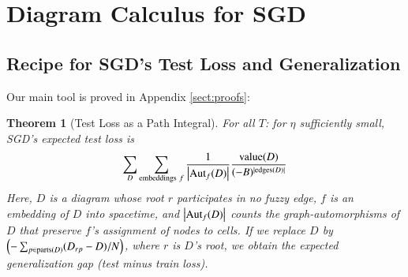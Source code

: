 \documentclass{article}
\theoremstyle{plain}
\newtheorem{thm}{Theorem}
\theoremstyle{definition}
\newcommand{\wrap}[1]{\left(#1\right)}
\newcommand{\wabs}[1]{\left|#1\right|}
\newcommand{\Aut}{\text{\textnormal{Aut}}}
\newcommand{\dvalue}{\text{\textnormal{value}}}
\newcommand{\edges}{\text{\textnormal{edges}}}
\newcommand{\parts}{\text{\textnormal{parts}}}
\begin{document}

\section{Diagram Calculus for SGD} \label{sect:calculus}

           
    \subsection{Recipe for SGD's Test Loss and Generalization}

        Our main tool is proved in Appendix \ref{sect:proofs}:
        
        \begin{thm}[Test Loss as a Path Integral] \label{thm:sgdcoef}
            For all $T$: for $\eta$ sufficiently small, SGD's expected test
            loss is
            \begin{equation*}\label{eq:sgdcoef}
                \sum_{D}
                    \sum_{\text{embeddings}~f}
                    \frac{1}{\wabs{\Aut_f(D)}}
                \frac{\dvalue(D)}{(-B)^{|\edges(D)|}}
            \end{equation*}
            Here, $D$ is a diagram whose root $r$ participates in no fuzzy
            edge, $f$ is an embedding of $D$ into spacetime, and
            $\wabs{\Aut_f(D)}$ counts the graph-automorphisms of $D$ that
            preserve $f$'s assignment of nodes to cells.
            If we replace $D$ by 
            $
                \wrap{-\sum_{p \in \parts(D)} (D_{rp} - D)/N}
            $, where $r$ is $D$'s root,
            we obtain the expected generalization gap (test minus train loss).
        \end{thm}
    
\end{document}
